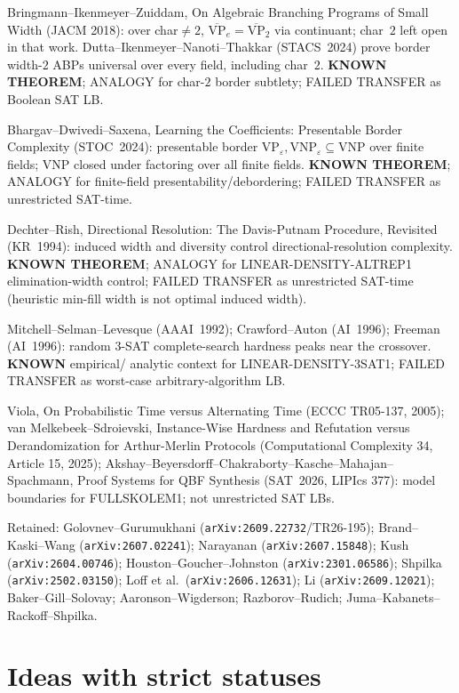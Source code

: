 \documentclass[11pt]{article}
\begin{document}
Bringmann--Ikenmeyer--Zuiddam, On Algebraic Branching Programs of Small Width (JACM 2018):
over char$\neq 2$, $\overline{\mathrm{VP}}_e=\overline{\mathrm{VP}}_2$ via continuant; char~$2$
left open in that work. Dutta--Ikenmeyer--Nanoti--Thakkar (STACS~2024) prove border width-$2$
ABPs universal over every field, including char~$2$. \textbf{KNOWN THEOREM}; ANALOGY for
char-$2$ border subtlety; FAILED TRANSFER as Boolean SAT LB.

Bhargav--Dwivedi--Saxena, Learning the Coefficients: Presentable Border Complexity
(STOC~2024): presentable border $\mathrm{VP}_\varepsilon,\mathrm{VNP}_\varepsilon\subseteq\mathrm{VNP}$
over finite fields; VNP closed under factoring over all finite fields. \textbf{KNOWN THEOREM};
ANALOGY for finite-field presentability/debordering; FAILED TRANSFER as unrestricted SAT-time.

Dechter--Rish, Directional Resolution: The Davis-Putnam Procedure, Revisited (KR~1994):
induced width and diversity control directional-resolution complexity. \textbf{KNOWN THEOREM};
ANALOGY for LINEAR-DENSITY-ALTREP1 elimination-width control; FAILED TRANSFER as unrestricted
SAT-time (heuristic min-fill width is not optimal induced width).

Mitchell--Selman--Levesque (AAAI~1992); Crawford--Auton (AI~1996); Freeman (AI~1996):
random 3-SAT complete-search hardness peaks near the crossover. \textbf{KNOWN} empirical/
analytic context for LINEAR-DENSITY-3SAT1; FAILED TRANSFER as worst-case arbitrary-algorithm LB.

Viola, On Probabilistic Time versus Alternating Time (ECCC TR05-137, 2005);
van Melkebeek--Sdroievski, Instance-Wise Hardness and Refutation versus Derandomization for
Arthur-Merlin Protocols (Computational Complexity 34, Article 15, 2025);
Akshay--Beyersdorff--Chakraborty--Kasche--Mahajan--Spachmann, Proof Systems for QBF Synthesis
(SAT~2026, LIPIcs 377): model boundaries for FULLSKOLEM1; not unrestricted SAT LBs.

Retained: Golovnev--Gurumukhani (\texttt{arXiv:2609.22732}/TR26-195); Brand--Kaski--Wang
(\texttt{arXiv:2607.02241}); Narayanan (\texttt{arXiv:2607.15848}); Kush (\texttt{arXiv:2604.00746});
Houston--Goucher--Johnston (\texttt{arXiv:2301.06586}); Shpilka (\texttt{arXiv:2502.03150});
Loff et al.\ (\texttt{arXiv:2606.12631}); Li (\texttt{arXiv:2609.12021}); Baker--Gill--Solovay;
Aaronson--Wigderson; Razborov--Rudich; Juma--Kabanets--Rackoff--Shpilka.

\section*{Ideas with strict statuses}
\end{document}
